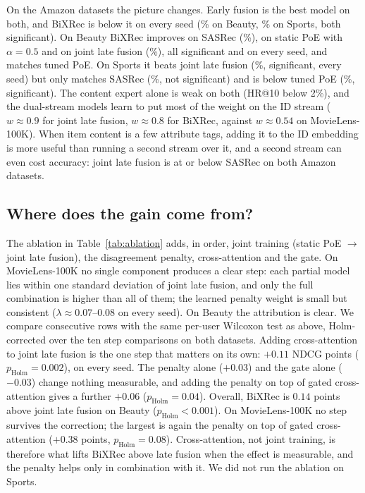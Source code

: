 \documentclass[conference]{IEEEtran}
\begin{document}
On the Amazon datasets the picture changes. Early fusion is the best model on both, and BiXRec is below it on
every seed (\gainBeautyHybrid\% on Beauty, \gainSportsHybrid\% on Sports, both significant). On Beauty BiXRec
improves on SASRec (\gainBeautySasrec\%), on static PoE with $\alpha=0.5$ and on joint late fusion
(\gainBeautyLate\%), all significant and on every seed, and matches tuned PoE. On Sports it beats joint late fusion
(\gainSportsLate\%, significant, every seed) but only matches SASRec (\gainSportsSasrec\%, not significant) and is
below tuned PoE (\gainSportsPoe\%, significant). The content expert alone is weak on both (HR@10 below 2\%), and
the dual-stream models learn to put most of the weight on the ID stream ($w\approx0.9$ for joint late fusion,
$w\approx0.8$ for BiXRec, against $w\approx0.54$ on MovieLens-100K). When item content is a few attribute
tags, adding it to the ID embedding is more useful than running a second stream over it, and a second stream can
even cost accuracy: joint late fusion is at or below SASRec on both Amazon datasets.

\subsection{Where does the gain come from?}
\tabAbl
The ablation in Table~\ref{tab:ablation} adds, in order, joint training (static PoE $\rightarrow$ joint late fusion),
the disagreement penalty, cross-attention and the gate. On MovieLens-100K no single component produces a clear step:
each partial model lies within one standard deviation of joint late fusion, and only the full combination is
higher than all of them; the learned penalty weight is small but consistent ($\lambda\approx0.07$--$0.08$ on every
seed). On Beauty the attribution is clear. We compare consecutive rows with the same per-user Wilcoxon test as
above, Holm-corrected over the ten step comparisons on both datasets. Adding cross-attention to joint late fusion is
the one step that matters on its own: $+0.11$ NDCG points ($p_\mathrm{Holm}=0.002$), on every seed. The penalty
alone ($+0.03$) and the gate alone ($-0.03$) change nothing measurable, and adding the penalty on top of gated
cross-attention gives a further $+0.06$ ($p_\mathrm{Holm}=0.04$). Overall, BiXRec is $0.14$ points above joint late
fusion on Beauty ($p_\mathrm{Holm}<0.001$). On MovieLens-100K no step survives the correction; the largest
is again the penalty on top of gated cross-attention ($+0.38$ points, $p_\mathrm{Holm}=0.08$). Cross-attention,
not joint training, is therefore what lifts BiXRec above late fusion when the effect is measurable, and the penalty
helps only in combination with it. We did not run the ablation on Sports.
\end{document}
